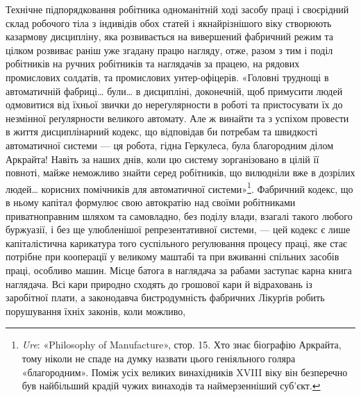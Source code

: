 Технічне підпорядковання робітника одноманітній ході засобу
праці і своєрідний склад робочого тіла з індивідів обох статей
і якнайрізнішого віку створюють казармову дисципліну, яка
розвивається на вивершений фабричний режим та цілком розвиває
раніш уже згадану працю нагляду, отже, разом з тим і
поділ робітників на ручних робітників та наглядачів за працею,
на рядових промислових солдатів, та промислових унтер-офіцерів.
«Головні труднощі в автоматичній фабриці\dots{} були\dots{} в дисципліні,
доконечній, щоб примусити людей одмовитися від їхньої
звички до нереґулярности в роботі та пристосувати їх до незмінної
реґулярности великого автомату. Але ж винайти та з успіхом
провести в життя дисциплінарний кодекс, що відповідав би
потребам та швидкості автоматичної системи — ця робота, гідна
Геркулеса, була благородним ділом Аркрайта! Навіть за наших
днів, коли цю систему зорганізовано в цілій її повноті, майже
неможливо знайти серед робітників, що вилюдніли вже в дозрілих
людей\dots{} корисних помічників для автоматичної системи»\footnote{
\emph{Ure}: «Philosophy of Manufacture», стор. 15. Хто знає біографію
Аркрайта, тому ніколи не спаде на думку назвати цього геніяльного
голяра «благородним». Поміж усіх великих винахідників XVIII віку
він безперечно був найбільший крадій чужих винаходів та наймерзенніший
суб’єкт.
}.
Фабричний кодекс, що в ньому капітал формулює свою автократію
над своїми робітниками приватноправним шляхом та самовладно,
без поділу влади, взагалі такого любого буржуазії, і
без ще улюбленішої репрезентативної системи, — цей кодекс є
лише капіталістична карикатура того суспільного реґулювання
процесу праці, яке стає потрібне при кооперації у великому маштабі
та при вживанні спільних засобів праці, особливо машин.
Місце батога в наглядача за рабами заступає карна книга наглядача.
Всі кари природно сходять до грошової кари й відраховань
із заробітної плати, а законодавча бистродумність фабричних
Лікурґів робить порушування їхніх законів, коли можливо,
